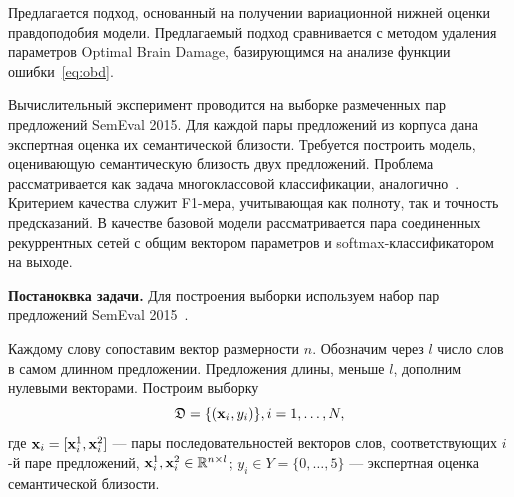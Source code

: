 Предлагается подход, основанный на получении вариационной нижней оценки правдоподобия модели. Предлагаемый подход сравнивается с методом удаления параметров Optimal Brain Damage, базирующимся на анализе функции ошибки~\eqref{eq:obd}. 

Вычислительный эксперимент проводится на выборке размеченных пар предложений SemEval 2015. Для каждой пары предложений из корпуса дана экспертная оценка их семантической близости. Требуется построить модель, оценивающую семантическую близость двух предложений. Проблема рассматривается как задача многоклассовой классификации, аналогично~\cite{sanborn}. Критерием качества служит F1-мера, учитывающая как полноту, так и точность предсказаний.
В качестве базовой модели рассматривается пара соединенных рекуррентных сетей с общим вектором параметров и softmax-классификатором на выходе.

\textbf{Постаноквка задачи. }
Для построения выборки используем набор пар предложений SemEval 2015~\cite{semeval2015}.

Каждому слову сопоставим вектор размерности $n$.
Обозначим через $l$ число слов в самом длинном предложении. Предложения длины, меньше $l$, дополним нулевыми векторами. 
Построим выборку
$$ {\mathfrak{D}} = \{({\textbf{x}}_i,y_i)\}, i = 1,\dots,N,$$
где ${\textbf{x}}_i = [{\textbf{x}}_i^1,{\textbf{x}}_i^2]$ --- пары последовательностей векторов слов, соответствующих $i$-й паре предложений, ${\textbf{x}}_i^1, {\textbf{x}}_i^2 \in \mathbb{R}^{n\times l}$;
$y_i \in Y = \{0,\dots,5\}$ --- экспертная оценка семантической близости. 


